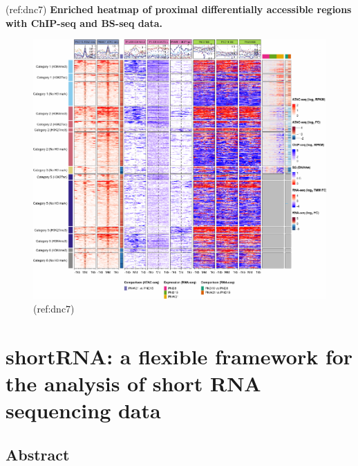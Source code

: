 \documentclass[12pt,twoside]{reedthesis}
\begin{document}
(ref:dnc7)
\textbf{Enriched heatmap of proximal differentially accessible regions with ChIP-seq and BS-seq data.}
\begin{figure}[h]

{\centering \includegraphics{thesis_files/figure-latex/dn7-1} 

}

\caption[Enriched heatmap of proximal DARs with ChIP-seq and BS-seq data]{(ref:dnc7)}\label{fig:dn7}
\end{figure}
\hypertarget{shortRNA}{%
\chapter{shortRNA: a flexible framework for the analysis of short RNA sequencing data}\label{shortRNA}}

\hypertarget{abstract}{%
\section{Abstract}\label{abstract}}
\end{document}
